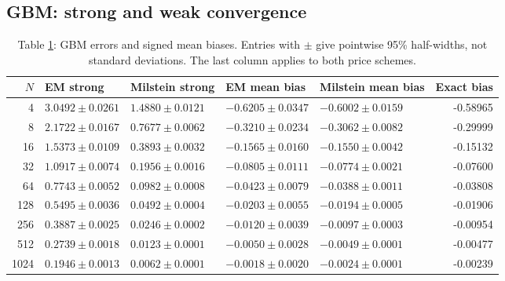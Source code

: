 \subsection{GBM: strong and weak convergence}
\begin{table}[H]\centering\scriptsize
\caption{Table \ref{tab:gbm}: GBM errors and signed mean biases. Entries with $\pm$ give pointwise 95\% half-widths, not standard deviations. The last column applies to both price schemes.}\label{tab:gbm}
\begin{tabular}{rllllr}\toprule
$N$ & EM strong & Milstein strong & EM mean bias & Milstein mean bias & Exact bias\\\midrule
4 & $3.0492\pm 0.0261$ & $1.4880\pm 0.0121$ & $-0.6205\pm 0.0347$ & $-0.6002\pm 0.0159$ & -0.58965\\
8 & $2.1722\pm 0.0167$ & $0.7677\pm 0.0062$ & $-0.3210\pm 0.0234$ & $-0.3062\pm 0.0082$ & -0.29999\\
16 & $1.5373\pm 0.0109$ & $0.3893\pm 0.0032$ & $-0.1565\pm 0.0160$ & $-0.1550\pm 0.0042$ & -0.15132\\
32 & $1.0917\pm 0.0074$ & $0.1956\pm 0.0016$ & $-0.0805\pm 0.0111$ & $-0.0774\pm 0.0021$ & -0.07600\\
64 & $0.7743\pm 0.0052$ & $0.0982\pm 0.0008$ & $-0.0423\pm 0.0079$ & $-0.0388\pm 0.0011$ & -0.03808\\
128 & $0.5495\pm 0.0036$ & $0.0492\pm 0.0004$ & $-0.0203\pm 0.0055$ & $-0.0194\pm 0.0005$ & -0.01906\\
256 & $0.3887\pm 0.0025$ & $0.0246\pm 0.0002$ & $-0.0120\pm 0.0039$ & $-0.0097\pm 0.0003$ & -0.00954\\
512 & $0.2739\pm 0.0018$ & $0.0123\pm 0.0001$ & $-0.0050\pm 0.0028$ & $-0.0049\pm 0.0001$ & -0.00477\\
1024 & $0.1946\pm 0.0013$ & $0.0062\pm 0.0001$ & $-0.0018\pm 0.0020$ & $-0.0024\pm 0.0001$ & -0.00239\\
\bottomrule\end{tabular}\end{table}
